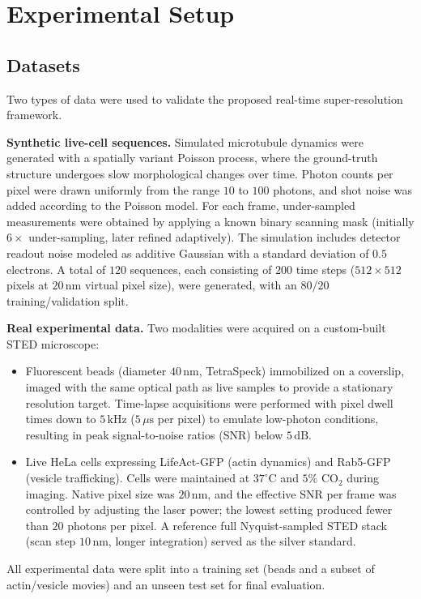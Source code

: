 \documentclass{article}
\begin{document}
\section{Experimental Setup}
\label{sec:experimental_setup}

\subsection{Datasets}
\label{subsec:datasets}
Two types of data were used to validate the proposed real-time super-resolution framework.

\textbf{Synthetic live-cell sequences.} Simulated microtubule dynamics were generated with a spatially variant Poisson process, where the ground-truth structure undergoes slow morphological changes over time. Photon counts per pixel were drawn uniformly from the range $10$ to $100$ photons, and shot noise was added according to the Poisson model. For each frame, under-sampled measurements were obtained by applying a known binary scanning mask (initially $6\times$ under-sampling, later refined adaptively). The simulation includes detector readout noise modeled as additive Gaussian with a standard deviation of $0.5$ electrons. A total of $120$ sequences, each consisting of $200$ time steps ($512\times512$ pixels at $20\,\mathrm{nm}$ virtual pixel size), were generated, with an $80/20$ training/validation split.

\textbf{Real experimental data.} Two modalities were acquired on a custom-built STED microscope:
\begin{itemize}
    \item Fluorescent beads (diameter $40\,\mathrm{nm}$, TetraSpeck) immobilized on a coverslip, imaged with the same optical path as live samples to provide a stationary resolution target. Time-lapse acquisitions were performed with pixel dwell times down to $5\,\mathrm{kHz}$ ($5\,\mu\mathrm{s}$ per pixel) to emulate low-photon conditions, resulting in peak signal-to-noise ratios (SNR) below $5\,\mathrm{dB}$.
    \item Live HeLa cells expressing LifeAct-GFP (actin dynamics) and Rab5-GFP (vesicle trafficking). Cells were maintained at $37^\circ\mathrm{C}$ and $5\%$ CO$_2$ during imaging. Native pixel size was $20\,\mathrm{nm}$, and the effective SNR per frame was controlled by adjusting the laser power; the lowest setting produced fewer than $20$ photons per pixel. A reference full Nyquist-sampled STED stack (scan step $10\,\mathrm{nm}$, longer integration) served as the silver standard.
\end{itemize}
All experimental data were split into a training set (beads and a subset of actin/vesicle movies) and an unseen test set for final evaluation.
\end{document}
